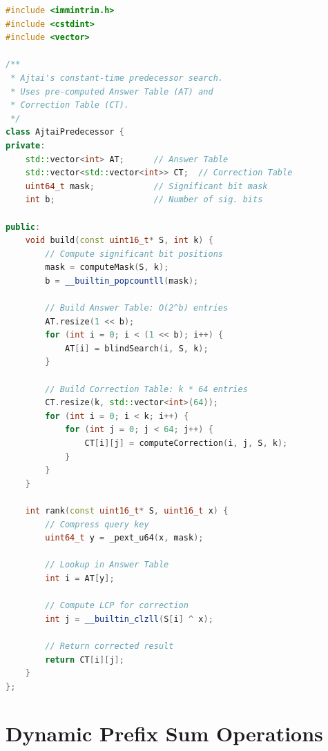 \begin{lstlisting}[language=C++, caption={Ajtai method using Answer and Correction tables}, label={lst:ajtai}]
#include <immintrin.h>
#include <cstdint>
#include <vector>

/**
 * Ajtai's constant-time predecessor search.
 * Uses pre-computed Answer Table (AT) and
 * Correction Table (CT).
 */
class AjtaiPredecessor {
private:
    std::vector<int> AT;      // Answer Table
    std::vector<std::vector<int>> CT;  // Correction Table
    uint64_t mask;            // Significant bit mask
    int b;                    // Number of sig. bits

public:
    void build(const uint16_t* S, int k) {
        // Compute significant bit positions
        mask = computeMask(S, k);
        b = __builtin_popcountll(mask);

        // Build Answer Table: O(2^b) entries
        AT.resize(1 << b);
        for (int i = 0; i < (1 << b); i++) {
            AT[i] = blindSearch(i, S, k);
        }

        // Build Correction Table: k * 64 entries
        CT.resize(k, std::vector<int>(64));
        for (int i = 0; i < k; i++) {
            for (int j = 0; j < 64; j++) {
                CT[i][j] = computeCorrection(i, j, S, k);
            }
        }
    }

    int rank(const uint16_t* S, uint16_t x) {
        // Compress query key
        uint64_t y = _pext_u64(x, mask);

        // Lookup in Answer Table
        int i = AT[y];

        // Compute LCP for correction
        int j = __builtin_clzll(S[i] ^ x);

        // Return corrected result
        return CT[i][j];
    }
};
\end{lstlisting}

\section{Dynamic Prefix Sum Operations}
\label{sec:prefixsum-code}

